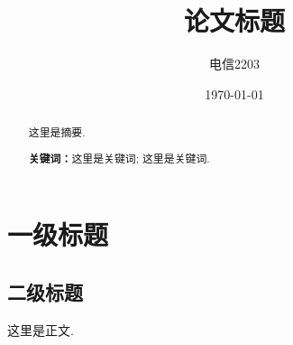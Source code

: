 \documentclass[12pt, a4paper, oneside]{ctexart}
\title{\textbf{论文标题}}
\author{电信2203\qquad陈熙予\qquad2224512913}
\date{\today}
\begin{document}
\maketitle

\setcounter{page}{0}
\maketitle
\thispagestyle{empty}

\begin{abstract}
    这里是摘要. 
    \par\textbf{关键词：}这里是关键词; 这里是关键词. 
\end{abstract}

\newpage

\setcounter{page}{1}
\tableofcontents

\newpage
\setcounter{page}{1}

\section{一级标题}

\subsection{二级标题}

这里是正文.\cite{1967Milgram}

\newpage




\newpage


\end{document}
